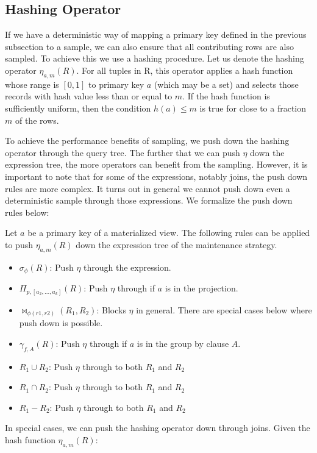 \subsection{Hashing Operator}
\label{push}
If we have a deterministic way of mapping a primary key defined in the previous subsection to a sample, we can also ensure that all contributing rows are also sampled. 
To achieve this we use a hashing procedure.
Let us denote the hashing operator $\eta_{a, m}(R)$. 
For all tuples in R, this operator applies a hash function whose range is $[0,1]$ to primary key $a$ (which may be a set) and selects those records with hash value less than or equal to $m$.
If the hash function is sufficiently uniform, then the condition $h(a) \le m$ is true for close to a fraction $m$ of the rows. 

To achieve the performance benefits of sampling, we push down the hashing operator through the query tree.
The further that we can push $\eta$ down the expression tree, the more operators can benefit from the sampling.
However, it is important to note that for some of the expressions, notably joins, the push down rules are more complex. 
It turns out in general we cannot push down even a deterministic sample through those expressions.
We formalize the push down rules below:
\begin{definition}
Let $a$ be a primary key of a materialized view. The following rules can be applied to push $\eta_{a, m}(R)$ down the expression tree of the maintenance strategy. 
\begin{itemize}[noitemsep]
\item $\sigma_{\phi}(R)$: Push $\eta$ through the expression.  
\item $\Pi_{p,[a_2,...,a_k]}(R)$: Push $\eta $ through if $a$ is in the projection.
\item $\bowtie_{\phi (r1,r2)}(R_1,R_2)$: Blocks $\eta $ in general. There are special cases below where push down is possible.
\item $\gamma_{f,A}(R)$: Push $\eta $ through if $a$ is in the group by clause $A$.
\item $R_1 \cup R_2$: Push $\eta $ through to both $R_1$ and $R_2$
\item $R_1 \cap R_2$: Push $\eta $ through to both $R_1$ and $R_2$
\item $R_1 - R_2$: Push $\eta $ through to both $R_1$ and $R_2$
\end{itemize}
\end{definition}
In special cases, we can push the hashing operator down through joins. 
Given the hash function $\eta_{a, m}(R)$:

